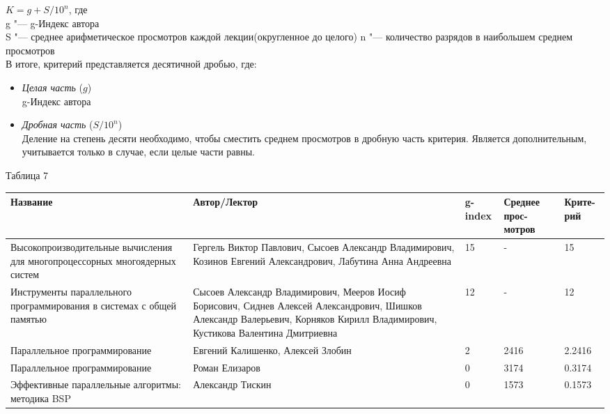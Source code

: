 \documentclass{article}
\begin{document}
		 $ K = g + S / 10^n $, где \\
			g "--- g-Индекс автора\\
			S "--- среднее арифметическое просмотров каждой лекции(округленное до целого)
			n "--- количество разрядов в наибольшем среднем просмотров\\			
			В итоге, критерий представляется десятичной дробью, где: 
				\begin{itemize}
					\item \textit{Целая часть} ($g$)\\
						g-Индекс автора
					\item \textit{Дробная часть} ($S / 10^n$)\\
						Деление на степень десяти необходимо, чтобы сместить среднем просмотров в дробную часть критерия. Является дополнительным, учитывается только в случае, если целые части равны.
				\end{itemize}
			\begin{flushleft}
				Таблица 7
				\begin{longtable}{|p{5.5cm}|p{5cm}|p{1.55cm}|p{1.7cm}|p{1.5cm}|}
\hline
Название & Автор/Лектор & g-index & Среднее прос-мотров & Крите-рий \\\hline

Высокопроизводительные вычисления для многопроцессорных многоядерных систем &
Гергель Виктор Павлович, Сысоев Александр Владимирович, Козинов Евгений Александрович, Лабутина Анна Андреевна & 15 & - & 15\\\hline

Инструменты параллельного программирования в системах с общей памятью &
Сысоев Александр Владимирович, Мееров Иосиф Борисович, Сиднев Алексей Александрович, Шишков Александр Валерьевич, Корняков Кирилл Владимирович, Кустикова Валентина Дмитриевна &
12 & - & 12\\\hline

Параллельное программирование &
Евгений Калишенко, Алексей Злобин & 2 & 2416 & 2.2416\\\hline

Параллельное программирование &
Роман Елизаров & 0 & 3174 & 0.3174 \\\hline

Эффективные параллельные алгоритмы: методика BSP &
Александр Тискин & 0 & 1573 & 0.1573 \\\hline


				\end{longtable}
			\end{flushleft}
\newpage
\end{document}
